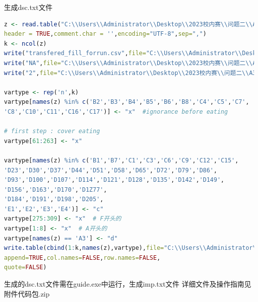 \documentclass{article}
\numberwithin{equation}{subsection}
\begin{document}
生成dsc.txt文件
\begin{lstlisting}[language=R]
z <- read.table("C:\\Users\\Administrator\\Desktop\\2023校内赛\\问题二\\A3\\transfered_fill_forrun.csv",
header = TRUE,comment.char = '',encoding="UTF-8",sep=",")
k <- ncol(z)
write("transfered_fill_forrun.csv",file="C:\\Users\\Administrator\\Desktop\\2023校内赛\\问题二\\A3\\dsc_A3.txt")
write("NA",file="C:\\Users\\Administrator\\Desktop\\2023校内赛\\问题二\\A3\\dsc_A3.txt",append=TRUE)
write("2",file="C:\\Users\\Administrator\\Desktop\\2023校内赛\\问题二\\A3\\dsc_A3.txt",append=TRUE)

vartype <- rep('n',k)
vartype[names(z) %in% c('B2','B3','B4','B5','B6','B8','C4','C5','C7',
'C8','C10','C11','C16','C17')] <- "x"  #ignorance before eating

# first step : cover eating
vartype[61:263] <- "x"

vartype[names(z) %in% c('B1','B7','C1','C3','C6','C9','C12','C15',
'D23','D30','D37','D44','D51','D58','D65','D72','D79','D86',
'D93','D100','D107','D114','D121','D128','D135','D142','D149',
'D156','D163','D170','D1Z77',
'D184','D191','D198','D205',
'E1','E2','E3','E4')] <- "c"
vartype[275:309] <- "x"  # F开头的
vartype[1:8] <- "x"  # A开头的
vartype[names(z) == 'A3'] <- "d"
write.table(cbind(1:k,names(z),vartype),file="C:\\Users\\Administrator\\Desktop\\2023校内赛\\问题二\\A3\\dsc_A3.txt",
append=TRUE,col.names=FALSE,row.names=FALSE,
quote=FALSE)
\end{lstlisting}
生成的dsc.txt文件需在guide.exe中运行，生成imp.txt文件
详细文件及操作指南见附件代码包.zip
\newpage
\end{document}
